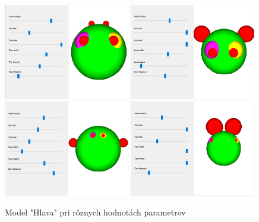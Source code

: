 \begin{figure}[H]
	\centering
	\includegraphics[width=0.49\textwidth]{obrazky-figures/Examples/head1.png}
	\includegraphics[width=0.49\textwidth]{obrazky-figures/Examples/head2.png}
	\includegraphics[width=0.49\textwidth]{obrazky-figures/Examples/head3.png}
	\includegraphics[width=0.49\textwidth]{obrazky-figures/Examples/head4.png}
	\caption{Model "Hlava" pri rôznych hodnotách parametrov}
	\label{fig:headModel}
\end{figure}



